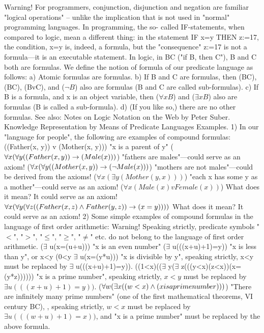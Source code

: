 Warning! For programmers, conjunction, disjunction and negation are familiar "logical operations" –
unlike the implication that is not used in "normal" programming languages. In programming, the so-
called IF-statements, when compared to logic, mean a different thing: in the statement IF x=y THEN
z:=17, the condition, x=y is, indeed, a formula, but the "consequence" z:=17 is not a formula---it is an
executable statement. In logic, in B\IMPLIES C ("if B, then C"), B and C both are formulas.
We define the notion of formula of our predicate language as follows:
a) Atomic formulas are formulas.
b) If B and C are formulas, then (B\IMPLIES C), (B\AND C), (BvC), and (\(\neg B\)) also are formulas (B and C are called
sub-formulas).
c) If B is a formula, and x is an object variable, then (\(\forall xB\)) and (\(\exists xB\)) also are formulas (B is called a
sub-formula).
d) (If you like so,) there are no other formulas.
See also:
Notes on Logic Notation on the Web by Peter Suber.
Knowledge Representation by Means of Predicate Languages
Examples. 1) In our "language for people", the following are examples of compound formulas:
((Father(x, y)) v (Mother(x, y))) "x is a parent of y"
(\(\forall x(\forall y((Father(x, y)) \rightarrow  (Male(x)))\)) "fathers are males"---could serve as an axiom!
(\(\forall x(\forall y((Mother(x, y)) \rightarrow  (\neg Male(x)))\)) "mothers are not males"---could be derived from the axioms!
(\(\forall x(\exists y(Mother(y, x)))\)) "each x has some y as a mother"---could serve as an axiom!
(\(\forall x(Male(x) v Female(x))\)) What does it mean? It could serve as an axiom!
\(\forall x(\forall y(\forall z((Father(x, z)\wedge Father(y,z))\rightarrow (x=y))))\) What does it mean? It could serve as an axiom!
2) Some simple examples of compound formulas in the language of first order arithmetic:
Warning! Speaking strictly, predicate symbols "\(<\)", "\(>\)", "\(\leq\)", "\(\geq\)", "\(\ne\)" etc. do not belong to the language of first order
arithmetic.
(\(\exists\) u(x=(u+u))) "x is an even number"
(\(\exists\) u(((x+u)+1)=y)) "x is less than y", or x<y
(0<y \AND  \(\exists\) u(x=(y*u))) "x is divisible by y", speaking strictly, x<y must be replaced by \(\exists\) u(((x+u)+1)=y)).
((1<x)\AND (\neg (\(\exists\) y(\(\exists\) z(((y<x)\AND (z<x))\AND (x=(y*z)))))) "x is a prime number", speaking strictly, \(x<y\) must be replaced by \(\exists u(((x+u)+1)=y))\).
(\(\forall w(\exists x((w<x)\wedge (x is a prime number)))\)) "There are infinitely many prime numbers" (one of the first mathematical theorems, VI century BC), , speaking strictly, \(w<x\) must be replaced by \(\exists u(((w+u)+1)=x))\), and "x is a prime number" must be replaced by the above formula.
